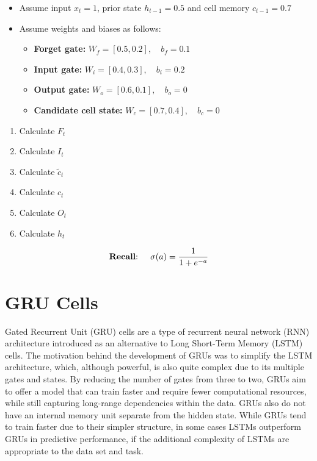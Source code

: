 \begin{exerciseboxpaper}
\begin{itemize}
  \item Assume input $x_t = 1$, prior state $h_{t-1}=0.5$ and cell memory $c_{t-1} = 0.7$
  \item Assume weights and biases as follows:
  \begin{itemize}
     \item {\bf Forget gate:} $W_f = [0.5, 0.2], \quad b_f = 0.1$
     \item {\bf Input gate:} $W_i = [0.4, 0.3], \quad b_i = 0.2$
     \item {\bf Output gate:} $W_o = [0.6, 0.1], \quad b_o = 0$
     \item {\bf Candidate cell state:} $W_c = [0.7, 0.4], \quad b_c = 0$
  \end{itemize}
\end{itemize}
\begin{enumerate}
  \item Calculate $F_t$
  \item Calculate $I_t$
  \item Calculate $\tilde{c}_t$
  \item Calculate $c_t$
  \item Calculate $O_t$
  \item Calculate $h_t$
\end{enumerate}
\begin{align*}\text{{\bf Recall}: }\quad\sigma(a)=\frac{1}{1+e^{-a}}\end{align*}
\end{exerciseboxpaper}

\section{GRU Cells}

Gated Recurrent Unit (GRU) cells are a type of recurrent neural network (RNN) architecture introduced as an alternative to Long Short-Term Memory (LSTM) cells. The motivation behind the development of GRUs was to simplify the LSTM architecture, which, although powerful, is also quite complex due to its multiple gates and states. By reducing the number of gates from three to two, GRUs aim to offer a model that can train faster and require fewer computational resources, while still capturing long-range dependencies within the data. GRUs also do not have an internal memory unit separate from the hidden state. While GRUs tend to train faster due to their simpler structure, in some cases LSTMs outperform GRUs in predictive performance, if the additional complexity of LSTMs are appropriate to the data set and task.

